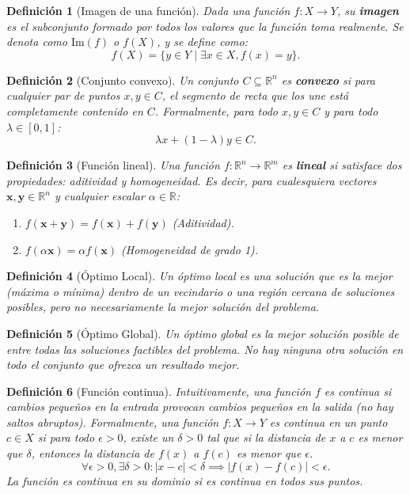 \documentclass[12pt,a4paper]{book}
\newtheorem{defi}{Definición}[section]
\begin{document}
\begin{defi}[Imagen de una función]
Dada una función $f: X \to Y$, su \textbf{imagen} es el subconjunto formado por todos los valores que la función toma realmente. Se denota como $\text{Im}(f)$ o $f(X)$, y se define como:
$$ f(X) = \{y \in Y \mid \exists x \in X, f(x) = y \} .$$
\end{defi}

\begin{defi}[Conjunto convexo]
\label{def:convexo}
Un conjunto $C \subseteq \mathbb{R}^n$ es \textbf{convexo} si para cualquier par de puntos $x, y \in C$, el segmento de recta que los une está completamente contenido en $C$. Formalmente, para todo $x, y \in C$ y para todo $\lambda \in [0, 1]$:
$$ \lambda x + (1-\lambda)y \in C .$$
\end{defi}

\begin{defi}[Función lineal]
\label{def:f_lineal}
Una función $f: \mathbb{R}^n \to \mathbb{R}^m$ es \textbf{lineal} si satisface dos propiedades: aditividad y homogeneidad. Es decir, para cualesquiera vectores $\mathbf{x}, \mathbf{y} \in \mathbb{R}^n$ y cualquier escalar $\alpha \in \mathbb{R}$:
\begin{enumerate}
    \item $f(\mathbf{x}+\mathbf{y}) = f(\mathbf{x}) + f(\mathbf{y})$ (Aditividad).
    \item $f(\alpha \mathbf{x}) = \alpha f(\mathbf{x})$ (Homogeneidad de grado 1).
\end{enumerate}
\end{defi}

\begin{defi}[Óptimo Local]
\label{def:optimo_local}
Un óptimo local es una solución que es la mejor (máxima o mínima) dentro de un vecindario o una región cercana de soluciones posibles,
pero no necesariamente la mejor solución del problema.
\end{defi}

\begin{defi}[Óptimo Global]
\label{def:optimo_global}
Un óptimo global es la mejor solución posible de entre todas las soluciones factibles del problema.
No hay ninguna otra solución en todo el conjunto que ofrezca un resultado mejor.

\end{defi}


\begin{defi}[Función continua]
\label{def:fun_continua}
Intuitivamente, una función $f$ es continua si cambios pequeños en la entrada provocan cambios pequeños en la salida (no hay saltos abruptos). Formalmente, una función $f: X \to Y$ es continua en un punto $c \in X$ si para todo $\epsilon > 0$, existe un $\delta > 0$ tal que si la distancia de $x$ a $c$ es menor que $\delta$, entonces la distancia de $f(x)$ a $f(c)$ es menor que $\epsilon$.
$$ \forall \epsilon > 0, \exists \delta > 0 : |x-c| < \delta \implies |f(x)-f(c)| < \epsilon .$$
La función es continua en su dominio si es continua en todos sus puntos.
\end{defi}
\end{document}
